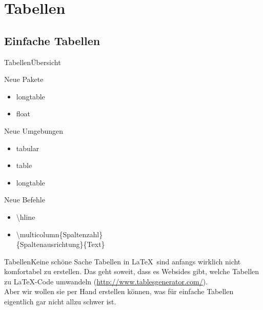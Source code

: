 \section{Tabellen}\subsection{Einfache Tabellen}
\begin{frame}{Tabellen}{\"Ubersicht}
   \begin{exampleblock}{Neue Pakete}
        \begin{multicols}{2}
        \begin{itemize}
            \item \color{cblue}longtable
            \item float \color{black}
        \end{itemize}
        \end{multicols}
   \end{exampleblock}
   \begin{block}{Neue Umgebungen}
        \begin{multicols}{3}
        \begin{itemize}
            \item \color{cpurple}tabular
            \item table
            \item longtable\color{black}
        \end{itemize}
        \end{multicols}
   \end{block}
   \begin{block}{Neue Befehle}
        \begin{multicols}{2}
        \begin{itemize}
            \item \color{cred}\textbackslash hline
            \columnbreak
            \item \color{cturkis}\textbackslash multicolumn\color{black}\{Spaltenzahl\}\\\{Spaltenausrichtung\}\{Text\}
        \end{itemize}
        \end{multicols}
   \end{block}
\end{frame}
\begin{frame}{Tabellen}{Keine sch\"one Sache \frownie}
   Tabellen in \LaTeX~sind anfangs wirklich nicht komfortabel zu erstellen. Das geht soweit, dass es Websides gibt, welche Tabellen zu \LaTeX-Code umwandeln (\small\url{http://www.tablesgenerator.com/}\normalsize).\\
   Aber wir wollen sie per Hand erstellen k\"onnen, was f\"ur einfache Tabellen eigentlich gar nicht allzu schwer ist.
\end{frame}
